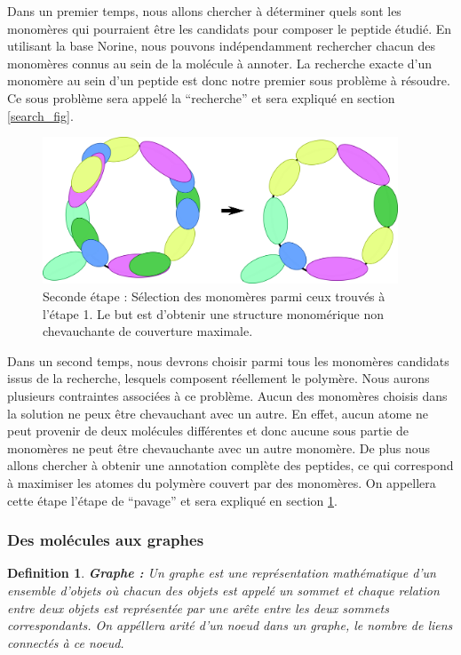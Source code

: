 Dans un premier temps, nous allons chercher à déterminer quels sont les monomères qui pourraient être les candidats pour composer le peptide étudié.
En utilisant la base Norine, nous pouvons indépendamment rechercher chacun des monomères connus au sein de la molécule à annoter.
La recherche exacte d'un monomère au sein d'un peptide est donc notre premier sous problème à résoudre.
Ce sous problème sera appelé la ``recherche'' et sera expliqué en section \ref{search_fig}.

\begin{figure}[!ht]
  \begin{center}
    \includegraphics[width=400px]{Figures/s2m/Intro/tiling.png}
    \caption{\label{tiling_fig}Seconde étape : Sélection des monomères parmi ceux trouvés à l'étape 1.
    Le but est d'obtenir une structure monomérique non chevauchante de couverture maximale.}
  \end{center}
\end{figure}

Dans un second temps, nous devrons choisir parmi tous les monomères candidats issus de la recherche, lesquels composent réellement le polymère.
Nous aurons plusieurs contraintes associées à ce problème.
Aucun des monomères choisis dans la solution ne peux être chevauchant avec un autre.
En effet, aucun atome ne peut provenir de deux molécules différentes et donc aucune sous partie de monomères ne peut être chevauchante avec un autre monomère.
De plus nous allons chercher à obtenir une annotation complète des peptides, ce qui correspond à maximiser les atomes du polymère couvert par des monomères.
On appellera cette étape l'étape de ``pavage'' et sera expliqué en section \ref{tiling_fig}.

\subsubsection{Des molécules aux graphes}

\newtheorem{definition}{Definition}
\begin{definition}\textbf{Graphe :}
 Un graphe est une représentation mathématique d'un ensemble d'objets où chacun des objets est appelé un sommet et
 chaque relation entre deux objets est représentée par une arête entre les deux sommets correspondants.
 On appéllera arité d'un noeud dans un graphe, le nombre de liens connectés à ce noeud.
\end{definition}

